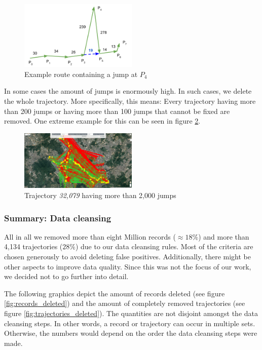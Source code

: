 \documentclass[10pt]{sig-alternate}
\begin{document}
\begin{figure}[ht]
\centering
\includegraphics[width=0.5\textwidth]{img/jumps.png}
\caption{Example route containing a jump at $P_4$}
\label{fig:jump}
\end{figure}

In some cases the amount of jumps is enormously high. In such cases, we delete the whole trajectory. More specifically, this means: Every trajectory having more than 200 jumps or having more than 100 jumps that cannot be fixed are removed. One extreme example for this can be seen in figure \ref{fig:more_jumps}.

\begin{figure}[ht]
\centering
\includegraphics[width=0.5\textwidth]{img/more_jumps.png}
\caption{Trajectory \textit{32,079} having more than 2,000 jumps}
\label{fig:more_jumps}
\end{figure}

\subsubsection{Summary: Data cleansing}
All in all we removed more than eight Million records ($\approx 18\%$) and more than 4,134 trajectories ($28\%$) due to our data cleansing rules. Most of the criteria are chosen generously to avoid deleting false positives. Additionally, there might be other aspects to improve data quality. Since this was not the focus of our work, we decided not to go further into detail.

The following graphics depict the amount of records deleted (see figure \ref{fig:records_deleted}) and the amount of completely removed trajectories (see figure \ref{fig:trajectories_deleted}). The quantities are not disjoint amongst the data cleansing steps. In other words, a record or trajectory can occur in multiple sets. Otherwise, the numbers would depend on the order the data cleansing steps were made.
\end{document}
